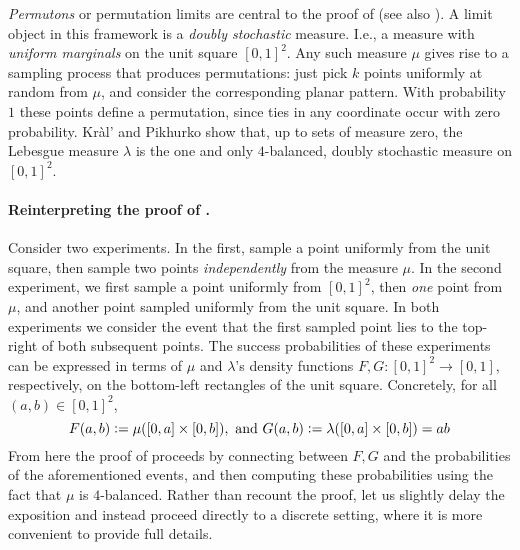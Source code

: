 \documentclass{article}
\newcommand{\eqdef}{\vcentcolon=}
\theoremstyle{remark}
\theoremstyle{plain}
\begin{document}
{\em Permutons} or permutation limits are central to
the proof of \cite{kral2013quasirandom} (see also \cite{hoppen2013limits, hoppen2011limits}). A limit object in this framework is a {\em doubly stochastic} measure. I.e., a measure with \emph{uniform marginals} on the unit square $[0,1]^2$. Any such measure $\mu$ gives rise to a sampling process that produces permutations: just pick $k$ points uniformly at random from $\mu$, and consider the corresponding planar pattern. With probability $1$ these points define a permutation, since ties in any coordinate occur with zero probability. Kr\`al' and Pikhurko show that, up to sets of measure zero, the Lebesgue measure $\lambda$ is the one and only $4$-balanced, doubly stochastic measure on $[0,1]^2$.

\paragraph{Reinterpreting the proof of \cite{kral2013quasirandom}.} Consider two experiments. In the first, sample a point uniformly from the unit square, then sample two points \emph{independently} from the measure $\mu$. In the second experiment, we first sample a point uniformly from $[0,1]^2$, then \emph{one} point from $\mu$, and another point sampled uniformly from the unit square. In both experiments we consider the event that the first sampled point lies to the top-right of both subsequent points. The success probabilities of these experiments can be expressed in terms of $\mu$ and $\lambda$'s density functions $F,G: [0,1]^2 \to [0,1]$, respectively, on the bottom-left rectangles of the unit square. Concretely, for all $(a,b) \in [0,1]^2$,
\[
    F(a,b) \eqdef \mu([0,a] \times [0,b]), \text{ and } G(a,b) \eqdef \lambda([0,a] \times [0,b]) = ab
\]
From here the proof of \cite{kral2013quasirandom} proceeds by connecting between $F,G$ and the probabilities of the aforementioned events, and then computing these probabilities using the fact that $\mu$ is $4$-balanced. Rather than recount the proof, let us slightly delay the exposition and instead proceed directly to a discrete setting, where it is more convenient to provide full details.
\end{document}
